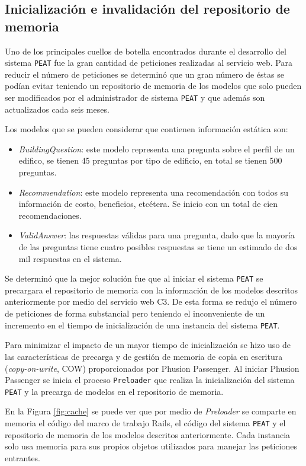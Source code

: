 \subsection{Inicialización e invalidación del repositorio de memoria}

Uno de los principales cuellos de botella encontrados durante el desarrollo
del sistema \texttt{PEAT} fue la gran cantidad de peticiones realizadas al
servicio web. Para reducir el número de peticiones se determinó que un gran
número de éstas se podían evitar teniendo un repositorio de memoria de los modelos
que solo pueden ser modificados por el administrador de sistema \texttt{PEAT}
y que además son actualizados cada seis meses. 

Los modelos que se pueden considerar que contienen información estática son:
\begin{itemize}
\item \textit{BuildingQuestion}: este modelo representa una pregunta sobre
  el perfil de un edifico, se tienen 45 preguntas por tipo de edificio, en
  total se tienen 500 preguntas.
\item \textit{Recommendation}: este modelo representa una recomendación
  con todos su información de costo, beneficios, etcétera. Se inicio con un
  total de cien recomendaciones.
\item \textit{ValidAnswer}: las respuestas válidas para una pregunta, dado
  que la mayoría de las preguntas tiene cuatro posibles respuestas se tiene
  un estimado de dos mil respuestas en el sistema.
\end{itemize}

Se determinó que la mejor solución fue que al iniciar el sistema \texttt{PEAT}
se precargara el repositorio de memoria con la información de los modelos descritos
anteriormente por medio del servicio web C3. De esta forma se redujo el número de
peticiones de forma substancial pero teniendo el inconveniente de un incremento
en el tiempo de inicialización de una instancia del sistema \texttt{PEAT}.

Para minimizar el impacto de un mayor tiempo de inicialización se hizo uso de las
características de precarga y de gestión de memoria de copia en escritura
(\textit{copy-on-write}, COW) proporcionados por Phusion Passenger. Al iniciar
Phusion Passenger se inicia el proceso \texttt{Preloader} que realiza la
inicialización del sistema \texttt{PEAT} y la precarga de modelos en el
repositorio de memoria.

En la Figura \ref{fig:cache} se puede ver que por medio de \textit{Preloader}
se comparte en memoria el código del marco de trabajo Rails, el código del sistema
\texttt{PEAT} y el repositorio de memoria de los modelos descritos anteriormente.
Cada instancia solo usa memoria para sus propios objetos utilizados para manejar las
peticiones entrantes.


